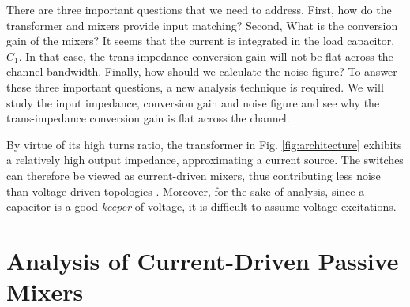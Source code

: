 There are three important questions that we need to address. First, how do the transformer and mixers provide input matching? Second, What is the
conversion gain of the mixers? It seems that the current is integrated in the load capacitor, $C_1$. In that case, the trans-impedance conversion gain
will not be flat across the channel bandwidth. Finally, how should we calculate the noise figure?
To answer these three important questions, a new analysis technique is required. We will study the input impedance, conversion gain and noise figure
and see why the trans-impedance conversion gain is flat across the channel.

By virtue of its high turns ratio, the transformer in Fig. \ref{fig:architecture} exhibits a relatively high output impedance, approximating a current
source. The switches can therefore be viewed as current-driven mixers, thus contributing less noise than voltage-driven topologies \cite{Kaczman}.
Moreover, for the sake of analysis, since a capacitor is a good {\em keeper} of voltage, it is difficult to assume voltage excitations.




\section{Analysis of Current-Driven Passive Mixers} 

